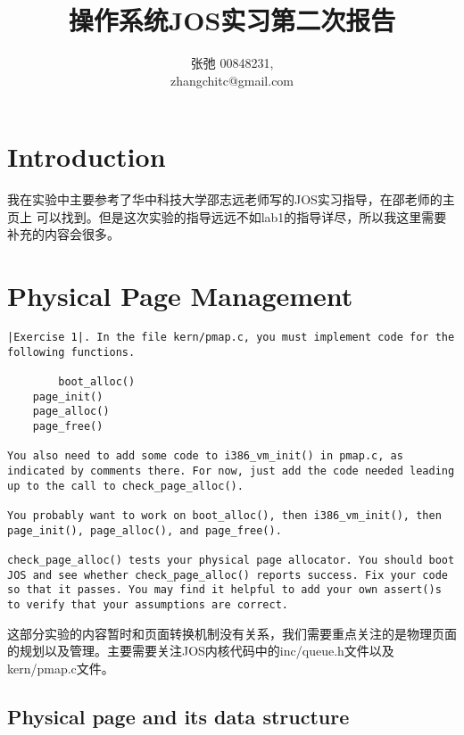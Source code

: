 \documentclass{article}
\begin{document}
\begin{CJK*}{UTF8}{gkai}

\title{操作系统JOS实习第二次报告}
\author{张弛 \hspace{1ex} 00848231, \\
        zhangchitc@gmail.com}

\maketitle
\tableofcontents
\newpage

\section{Introduction}

我在实验中主要参考了华中科技大学邵志远老师写的JOS实习指导，在邵老师的主页上 可以找到。但是这次实验的指导远远不如lab1的指导详尽，所以我这里需要补充的内容会很多。

\section{Physical Page Management}


\begin{lstlisting}[style=exercise]
|Exercise 1|. In the file kern/pmap.c, you must implement code for the following functions.

        boot_alloc()
	page_init()
	page_alloc()
	page_free()
	
You also need to add some code to i386_vm_init() in pmap.c, as indicated by comments there. For now, just add the code needed leading up to the call to check_page_alloc().

You probably want to work on boot_alloc(), then i386_vm_init(), then page_init(), page_alloc(), and page_free().

check_page_alloc() tests your physical page allocator. You should boot JOS and see whether check_page_alloc() reports success. Fix your code so that it passes. You may find it helpful to add your own assert()s to verify that your assumptions are correct.
\end{lstlisting}

这部分实验的内容暂时和页面转换机制没有关系，我们需要重点关注的是物理页面的规划以及管理。主要需要关注JOS内核代码中的inc/queue.h文件以及kern/pmap.c文件。

\subsection{Physical page and its data structure}


\end{CJK*}
\end{document}
